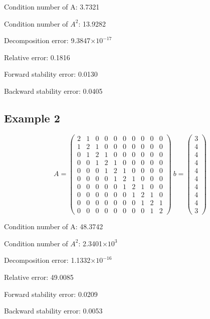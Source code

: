 \documentclass[12pt]{article}
\providecommand{\e}[1]{\ensuremath{\times 10^{#1}}}
\begin{document}
Condition number of A: 3.7321

Condition number of $A^2$: 13.9282

Decomposition error: 9.3847\e{-17}

Relative error: 0.1816

Forward stability error: 0.0130

Backward stability error: 0.0405

\subsection{Example 2}
$$A = \left(\begin{array}{cccccccccc} 2 & 1 & 0 & 0 & 0 & 0 & 0 & 0 & 0 & 0\\ 1 & 2 & 1 & 0 & 0 & 0 & 0 & 0 & 0 & 0\\ 0 & 1 & 2 & 1 & 0 & 0 & 0 & 0 & 0 & 0\\ 0 & 0 & 1 & 2 & 1 & 0 & 0 & 0 & 0 & 0\\ 0 & 0 & 0 & 1 & 2 & 1 & 0 & 0 & 0 & 0\\ 0 & 0 & 0 & 0 & 1 & 2 & 1 & 0 & 0 & 0\\ 0 & 0 & 0 & 0 & 0 & 1 & 2 & 1 & 0 & 0\\ 0 & 0 & 0 & 0 & 0 & 0 & 1 & 2 & 1 & 0\\ 0 & 0 & 0 & 0 & 0 & 0 & 0 & 1 & 2 & 1\\ 0 & 0 & 0 & 0 & 0 & 0 & 0 & 0 & 1 & 2 \end{array}\right)\ 
b = \left(\begin{array}{c} 3\\ 4\\ 4\\ 4\\ 4\\ 4\\ 4\\ 4\\ 4\\ 3 \end{array}\right)$$

Condition number of A: 
   48.3742

Condition number of $A^2$: 
   2.3401\e{3}

Decomposition error:
   1.1332\e{-16}

Relative error:
   49.0085

Forward stability error:
    0.0209

Backward stability error:
    0.0053
\end{document}
